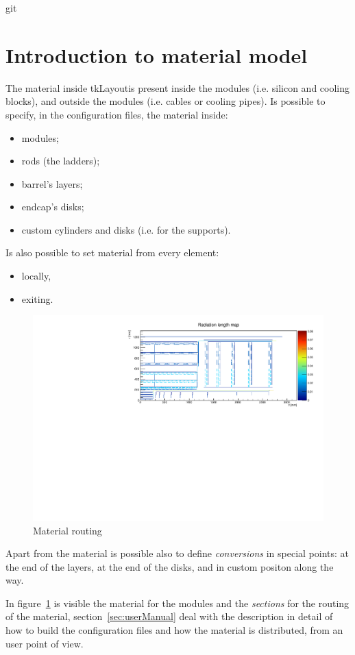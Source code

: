 git\documentclass[12pt, a4paper]{article}
\newcommand{\tkl}{tkLayout}
\begin{document}
\section{Introduction to material model}
The material inside \tkl is present inside the modules (i.e. silicon
and cooling blocks),
and outside the modules (i.e. cables or cooling pipes). Is possible to
specify, in the configuration files, the material inside:
\begin{itemize}
\item modules;
\item rods (the ladders);
\item barrel's layers;
\item endcap's disks;
\item custom cylinders and disks (i.e. for the supports).
\end{itemize}
Is also possible to set material from every element:
\begin{itemize}
\item locally,
\item exiting.
\end{itemize}

\begin{figure}[hbtp]
  \centering
  \includegraphics[width=\textwidth]{img/materialMap.pdf}  
  \caption{Material routing}
  \label{fig:materialMap}
\end{figure}

Apart from the material is possible also to define \emph{conversions}
in special points: at the end of the layers, at the end of the disks,
and in custom positon along the way.

In figure~\ref{fig:materialMap}
is visible the material for the modules and the \emph{sections} for
the routing of the material, section~\ref{sec:userManual} deal with
the description in detail of how to build the configuration files and
how the material is distributed, from an user point of view.
\end{document}
